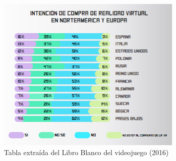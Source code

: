 \begin{figure}[h]
    \centering
    \includegraphics[width=0.8\textwidth]{images/estadodelarte/mercado/intencion-compra-vr}
    \caption{Tabla extraída del Libro Blanco del videojuego (2016)}
\end{figure}

